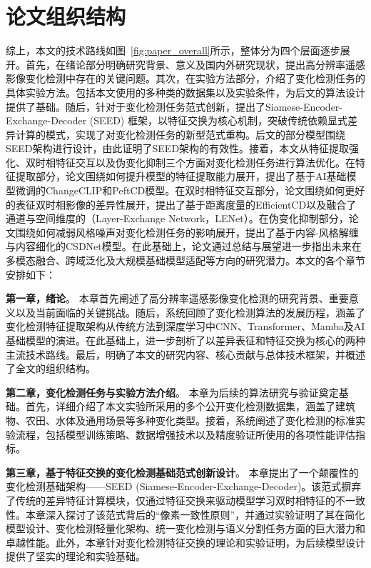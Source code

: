 \section{论文组织结构}
综上，本文的技术路线如图~\ref{fig:paper_overall}所示，整体分为四个层面逐步展开。首先，在绪论部分明确研究背景、意义及国内外研究现状，提出高分辨率遥感影像变化检测中存在的关键问题。其次，在实验方法部分，介绍了变化检测任务的具体实验方法。包括本文使用的多种类的数据集以及实验条件，为后文的算法设计提供了基础。随后，针对于变化检测任务范式创新，提出了Siamese-Encoder-Exchange-Decoder (SEED) 框架，以特征交换为核心机制，突破传统依赖显式差异计算的模式，实现了对变化检测任务的新型范式重构。后文的部分模型围绕SEED架构进行设计，由此证明了SEED架构的有效性。接着，本文从特征提取强化、双时相特征交互以及伪变化抑制三个方面对变化检测任务进行算法优化。在特征提取部分，论文围绕如何提升模型的特征提取能力展开，提出了基于AI基础模型微调的ChangeCLIP和PeftCD模型。在双时相特征交互部分，论文围绕如何更好的表征双时相影像的差异性展开，提出了基于距离度量的EfficientCD以及融合了通道与空间维度的（Layer-Exchange Network，LENet）。在伪变化抑制部分，论文围绕如何减弱风格噪声对变化检测任务的影响展开，提出了基于内容-风格解缠与内容细化的CSDNet模型。在此基础上，论文通过总结与展望进一步指出未来在多模态融合、跨域泛化及大规模基础模型适配等方向的研究潜力。本文的各个章节安排如下：

\textbf{第一章，绪论}。 本章首先阐述了高分辨率遥感影像变化检测的研究背景、重要意义以及当前面临的关键挑战。随后，系统回顾了变化检测算法的发展历程，涵盖了变化检测特征提取架构从传统方法到深度学习中CNN、Transformer、Mamba及AI基础模型的演进。在此基础上，进一步剖析了以差异表征和特征交换为核心的两种主流技术路线。最后，明确了本文的研究内容、核心贡献与总体技术框架，并概述了全文的组织结构。

\textbf{第二章，变化检测任务与实验方法介绍}。 本章为后续的算法研究与验证奠定基础。首先，详细介绍了本文实验所采用的多个公开变化检测数据集，涵盖了建筑物、农田、水体及通用场景等多种变化类型。接着，系统阐述了变化检测的标准实验流程，包括模型训练策略、数据增强技术以及精度验证所使用的各项性能评估指标。

\textbf{第三章，基于特征交换的变化检测基础范式创新设计}。 本章提出了一个颠覆性的变化检测基础架构——SEED (Siamese-Encoder-Exchange-Decoder)。该范式摒弃了传统的差异特征计算模块，仅通过特征交换来驱动模型学习双时相特征的不一致性。本章深入探讨了该范式背后的“像素一致性原则”，并通过实验证明了其在简化模型设计、变化检测轻量化架构、统一变化检测与语义分割任务方面的巨大潜力和卓越性能。此外，本章针对变化检测特征交换的理论和实验证明，为后续模型设计提供了坚实的理论和实验基础。

